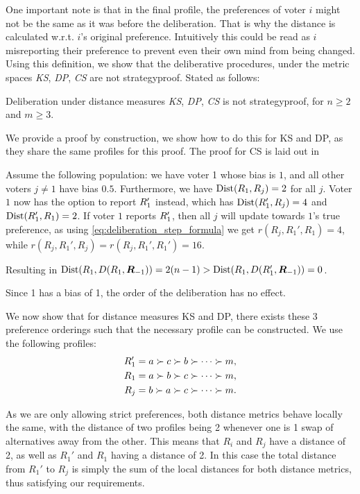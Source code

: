 One important note is that in the final profile, the preferences of voter \(i\) might not be the same as it was before the deliberation. That is why the distance is calculated w.r.t. \(i\)'s original preference. Intuitively this could be read as \(i\) misreporting their preference to prevent even their own mind from being changed.
Using this definition, we show that the deliberative procedures, under the metric spaces \textit{KS}, \textit{ DP}, \textit{ CS} are not strategyproof. Stated as follows:

\begin{proposition}
    Deliberation under distance measures \textit{KS}, \textit{ DP}, \textit{ CS} is not strategyproof, for $n \geq 2$ and $m \geq 3$.
\end{proposition}
We provide a proof by construction, we show how to do this for KS and DP, as they share the same profiles for this proof. The proof for CS is laid out in 
\begin{proofc}
    Assume the following population: we have voter 1 whose bias is $1$, and all other voters $j \neq 1$ have bias $0.5$. Furthermore, we have $\operatorname{Dist}(R_1, R_j) = 2$ for all $j$. Voter $1$ now has the option to report $R_{1}'$ instead, which has $\operatorname{Dist}(R_{1}', R_j) = 4$ and $\operatorname{Dist}(R_{1}', R_1) = 2$. If voter $1$ reports $R_1'$, then all $j$ will update towards $1$'s true preference, as using \cref{eq:deliberation_step_formula} we get $r(R_{j}, R_{1}', R_1) = 4$, while $r(R_{j}, R_{1}', R_j) = r(R_{j}, R_{1}', R_1') = 16$.

    Resulting in $\operatorname{Dist}(R_{1}, D(R_{1},\boldsymbol{R}_{-1})) = 2(n-1) >  \operatorname{Dist}(R_{1}, D(R_{1}', \boldsymbol{R}_{-1})) = 0$.

    Since 1 has a bias of 1, the order of the deliberation has no effect. 

    We now show that for distance measures KS and DP, there exists these 3 preference orderings such that the necessary profile can be constructed. We use the following profiles:
    \[
    \begin{aligned}
        R_{1}' &= a \succ c \succ b \succ \cdots \succ m, \\
        R_{1}  &= a \succ b \succ c \succ \cdots \succ m,\\ 
        R_{j} &= b \succ a \succ c \succ \cdots \succ m. \\
    \end{aligned}
\]

    As we are only allowing strict preferences, both distance metrics behave locally the same, with the distance of two profiles being 2 whenever one is 1 swap of alternatives away from the other. This means that  \(R_{i}\) and \(R_{j}\) have a distance of 2, as well as  \(R_{1}'\) and \(R_{1}\) having a distance of 2. In this case the total distance from \(R_{1}'\) to \(R_{j}\) is simply the sum of the local distances for both distance metrics, thus satisfying our requirements.
\end{proofc}


